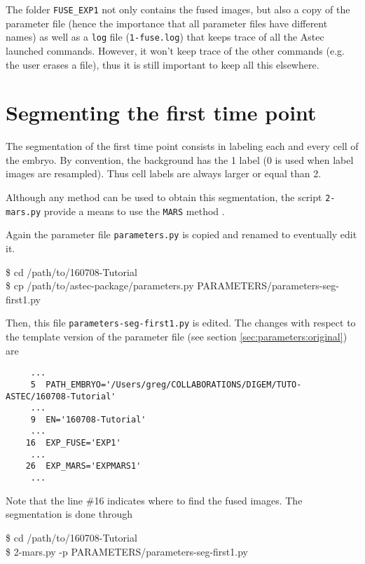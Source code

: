 The folder \texttt{FUSE\_EXP1} not only contains the fused images, but also a copy of the parameter file (hence the importance that all parameter files have different names) as well as a \texttt{log} file (\texttt{1-fuse.log}) that keeps trace of all the Astec launched commands. However, it won't keep trace of the other commands (e.g. the user erases a file), thus it is still important to keep all this elsewhere.










\section{Segmenting the first time point}

The segmentation of the first time point consists in labeling each and every cell of the embryo. By convention, the background has the 1 label (0 is used when label images are resampled). Thus cell labels are always larger or equal than 2.

Although any method can be used to obtain this segmentation, the script \texttt{2-mars.py} provide a means to use the \texttt{MARS} method \cite{fernandez:hal-00521491}.

Again the parameter file \texttt{parameters.py} is copied  and renamed to eventually edit it. 


\begin{code}{0.8}
\$ cd /path/to/160708-Tutorial\\
\$ cp /path/to/astec-package/parameters.py  PARAMETERS/parameters-seg-first1.py
\end{code}



Then, this file \texttt{parameters-seg-first1.py} is edited. The changes with respect to the template version of the parameter file (see section \ref{sec:parameters:original}) are

\begin{verbatim}
     ...
     5	PATH_EMBRYO='/Users/greg/COLLABORATIONS/DIGEM/TUTO-ASTEC/160708-Tutorial'	
     ...
     9	EN='160708-Tutorial'			
     ... 
    16	EXP_FUSE='EXP1'	
     ...
    26	EXP_MARS='EXPMARS1'		
     ...
\end{verbatim}

Note that the line \#16 indicates where to find the fused images.
The segmentation is done through

\begin{code}{0.8}
\$ cd /path/to/160708-Tutorial\\
\$ 2-mars.py -p PARAMETERS/parameters-seg-first1.py 
\end{code}


